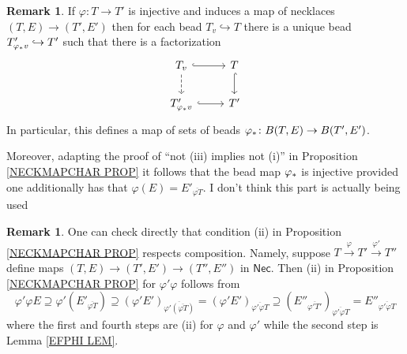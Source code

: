 \documentclass[a4paper,10pt
,draft
]{article}%
\numberwithin{equation}{section}
\numberwithin{figure}{section}
\theoremstyle{definition} %
\newtheorem{remark}[equation]{Remark}%
\newcommand{\1}{\ensuremath{\mathbbm 1}}%
\begin{document}
\begin{remark}\label{BEADMAP REM}
	If $\varphi \colon T \to T'$ is injective
	and induces a map of necklaces
	$(T,E) \to (T',E')$ then
	for each bead 
	$T_{v} \hookrightarrow T$
	there is a unique bead
	$T'_{\varphi_{\**} v} \hookrightarrow T'$
	such that there is a factorization	
\begin{equation}
\begin{tikzcd}
	T_v
	\ar[hookrightarrow]{r} 
	\ar[dashed]{d}
&
	T
	\ar[hookrightarrow]{d}
\\
	T'_{\varphi_{\**} v}
	\ar[hookrightarrow]{r}
&
	T'
\end{tikzcd}
\end{equation}
In particular, 
this defines a map of sets of beads
$\varphi_{\**} \colon 
B(T,E) \to B(T',E')$.

{\color{green} Moreover, adapting the proof of 
``not (iii) implies not (i)''
in Proposition \ref{NECKMAPCHAR PROP}
it follows that the bead map
$\varphi_{\**}$ is injective
provided one additionally has that  
$\varphi(E) = E'_{\overline{\varphi T}}$.}
{\color{red} I don't think this part is actually being used}
\end{remark}




\begin{remark}
One can check directly that 
condition (ii) in Proposition \ref{NECKMAPCHAR PROP}
respects composition.
Namely, suppose $T \xrightarrow{\varphi} T' \xrightarrow{\varphi'} T''$
define maps
$(T,E) \to (T',E') \to (T'',E'')$
in $\mathsf{Nec}$.
Then (ii) in Proposition \ref{NECKMAPCHAR PROP}
for $\varphi' \varphi$
follows from  
\[
\varphi' \varphi E
	\supseteq
\varphi'
\left(E'_{\overline{\varphi T}}\right)
	\supseteq
\left(\varphi' E'\right)_
{\overline{\varphi' (\overline{\varphi T})}}
	=
\left(\varphi' E'\right)_
{\overline{\varphi' \varphi T}}
	\supseteq
\left(
E''_{\overline{\varphi' T'}}\right)_
{\overline{\varphi' \varphi T}}
	=
E''_{\overline{\varphi' \varphi T}}
\]
where the first and fourth steps are 
(ii) for $\varphi$ and $\varphi'$
while the second step is Lemma \ref{EFPHI LEM}.
\end{remark}
\end{document}
